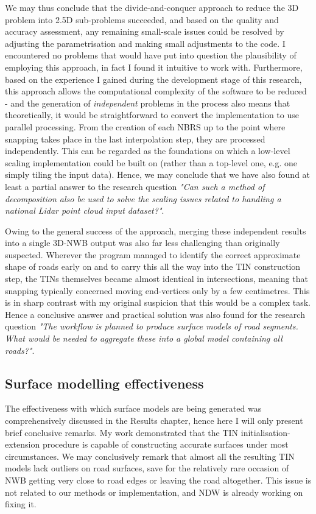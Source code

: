 We may thus conclude that the divide-and-conquer approach to reduce the 3D problem into 2.5D sub-problems succeeded, and based on the quality and accuracy assessment, any remaining small-scale issues could be resolved by adjusting the parametrisation and making small adjustments to the code. I encountered no problems that would have put into question the plausibility of employing this approach, in fact I found it intuitive to work with. Furthermore, based on the experience I gained during the development stage of this research, this approach allows the computational complexity of the software to be reduced - and the generation of \textit{independent} problems in the process also means that theoretically, it would be straightforward to convert the implementation to use parallel processing. From the creation of each NBRS up to the point where snapping takes place in the last interpolation step, they are processed independently. This can be regarded as the foundations on which a low-level scaling implementation could be built on (rather than a top-level one, e.g. one simply tiling the input data). Hence, we may conclude that we have also found at least a partial answer to the research question \textit{"Can such a method of decomposition also be used to solve the scaling issues related to handling a national Lidar point cloud input dataset?"}.

Owing to the general success of the approach, merging these independent results into a single 3D-NWB output was also far less challenging than originally suspected. Wherever the program managed to identify the correct approximate shape of roads early on and to carry this all the way into the TIN construction step, the TINs themselves became almost identical in intersections, meaning that snapping typically concerned moving end-vertices only by a few centimetres. This is in sharp contrast with my original suspicion that this would be a complex task. Hence a conclusive answer and practical solution was also found for the research question \textit{"The workflow is planned to produce surface models of \textit{road segments}. What would be needed to aggregate these into a global model containing all roads?"}.

\subsection{Surface modelling effectiveness}
\label{sub:effectivenessmodelling}

The effectiveness with which surface models are being generated was comprehensively discussed in the Results chapter, hence here I will only present brief conclusive remarks. My work demonstrated that the TIN initialisation-extension procedure is capable of constructing accurate surfaces under most circumstances. We may conclusively remark that almost all the resulting TIN models lack outliers on road surfaces, save for the relatively rare occasion of NWB getting very close to road edges or leaving the road altogether. This issue is not related to our methods or implementation, and NDW is already working on fixing it.

